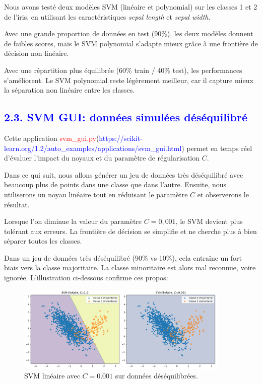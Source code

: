 \documentclass[
  12pt,
]{article}
\begin{document}
Nous avons testé deux modèles SVM (linéaire et polynomial) sur les
classes 1 et 2 de l'iris, en utilisant les caractéristiques
\textit{sepal length} et \textit{sepal width}.

Avec une grande proportion de données en test (90\%), les deux modèles
donnent de faibles scores, mais le SVM polynomial s'adapte mieux grâce à
une frontière de décision non linéaire.

Avec une répartition plus équilibrée (60\% train / 40\% test), les
performances s'améliorent. Le SVM polynomial reste légèrement meilleur,
car il capture mieux la séparation non linéaire entre les classes.

\subsection{\texorpdfstring{\textcolor{blue}{2.3. SVM GUI: données simulées déséquilibré}}{}}\label{section-4}

Cette application
\textcolor{red}{svm\_gui.py}(\textcolor{blue}{https://scikit-learn.org/1.2/auto\_examples/applications/svm\_gui.html})
permet en temps réel d'évaluer l'impact du noyaux et du paramètre de
régularisation \(C\).

Dans ce qui suit, nous allons générer un jeu de données très
déséquilibré avec beaucoup plus de points dans une classe que dans
l'autre. Ensuite, nous utiliserons un noyau linéaire tout en réduisant
le paramètre \(C\) et observerons le résultat.

Lorsque l'on diminue la valeur du paramètre \(C=0,001\), le SVM devient
plus tolérant aux erreurs. La frontière de décision se simplifie et ne
cherche plus à bien séparer toutes les classes.

Dans un jeu de données très déséquilibré (90\% vs 10\%), cela entraîne
un fort biais vers la classe majoritaire. La classe minoritaire est
alors mal reconnue, voire ignorée. L'illustration ci-dessous confirme
ces propos:

\begin{figure}[H]
    \centering
    \includegraphics[width=0.9\textwidth]{vis/classif_simul_cpetit.png}
    \caption{SVM linéaire avec $C = 0.001$ sur données déséquilibrées.}
    \label{fig:simule_c_petit}
\end{figure}
\end{document}
